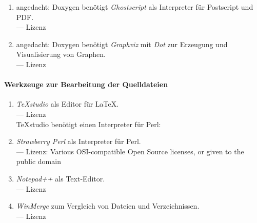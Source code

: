\begin{enumerate}
	\item\label{Werkzeug:Ghostscript}angedacht: Doxygen benötigt \emph{Ghostscript} als Interpreter für Postscript und PDF.
	\\
	--- Lizenz 

	\item\label{Werkzeug:Graphviz}angedacht: Doxygen benötigt \emph{Graphviz} mit \emph{Dot} zur Erzeugung und Visualisierung von Graphen.
	\\
	--- Lizenz 

	\setcounter{Enumi}{\value{enumi}}%
\end{enumerate}

\paragraph{Werkzeuge zur Bearbeitung der Quelldateien}%

\begin{enumerate}
	\setcounter{enumi}{\value{Enumi}}%

	\item\label{Werkzeug:TeXstudio}\emph{\TeX studio} als Editor für \LaTeX.
	\\
	--- Lizenz 
	\\\TeX studio benötigt einen Interpreter für Perl:

	\item\label{Werkzeug:Perl}\emph{Strawberry Perl} als Interpreter für Perl.
	\\
	--- Lizenz: Various OSI-compatible Open Source licenses, or given to the public domain

	\item\label{Werkzeug:Notepadpp}\emph{Notepad++} als Text-Editor.
	\\
	--- Lizenz 

	\item\label{Werkzeug:WinMerge}\emph{WinMerge} zum Vergleich von Dateien und Verzeichnissen.
	\\
	--- Lizenz 

	\setcounter{Enumi}{\value{enumi}}%
\end{enumerate}

